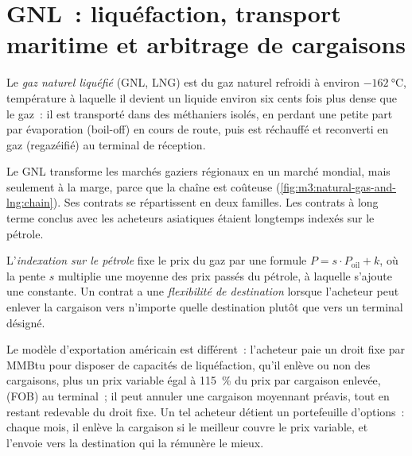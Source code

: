 \section{GNL~: liquéfaction, transport maritime et arbitrage de cargaisons}

\begin{definition}\label{def:m3:natural-gas-and-lng:lng}
Le \emph{gaz naturel liquéfié} (GNL, LNG) est du gaz naturel refroidi
à environ $-\qty{162}{\degreeCelsius}$, température à laquelle il devient un liquide environ six cents
fois plus dense que le gaz~: il est transporté dans des méthaniers isolés, en perdant une petite part
par évaporation (boil-off) en cours de route, puis est réchauffé et reconverti en gaz (regazéifié) au terminal de réception.
\end{definition}

Le GNL transforme les marchés gaziers régionaux en un marché mondial, mais seulement à la marge, parce que la
chaîne est coûteuse (\cref{fig:m3:natural-gas-and-lng:chain}). Ses contrats se répartissent en deux
familles. Les contrats à long terme conclus avec les acheteurs asiatiques étaient longtemps indexés sur le pétrole.

\begin{definition}\label{def:m3:natural-gas-and-lng:contracts}
L'\emph{indexation sur le pétrole} fixe le prix du gaz par une formule $P = s \cdot P_{\mathrm{oil}}
+ k$, où la pente $s$ multiplie une moyenne des prix passés du pétrole, à laquelle s'ajoute une constante. Un contrat a une
\emph{flexibilité de destination} lorsque l'acheteur peut enlever la
cargaison vers n'importe quelle destination plutôt que vers un terminal désigné.
\end{definition}

Le modèle d'exportation américain est différent~: l'acheteur paie un droit fixe par MMBtu pour
disposer de capacités de liquéfaction, qu'il enlève ou non des cargaisons, plus un prix variable égal à 115~\% du
prix  par cargaison enlevée,  (FOB) au terminal~; il peut annuler une cargaison
moyennant préavis, tout en restant redevable du droit fixe. Un tel acheteur détient un portefeuille d'options~: chaque mois, il enlève la cargaison
si le meilleur  couvre le prix variable, et l'envoie vers la destination qui
la rémunère le mieux.

